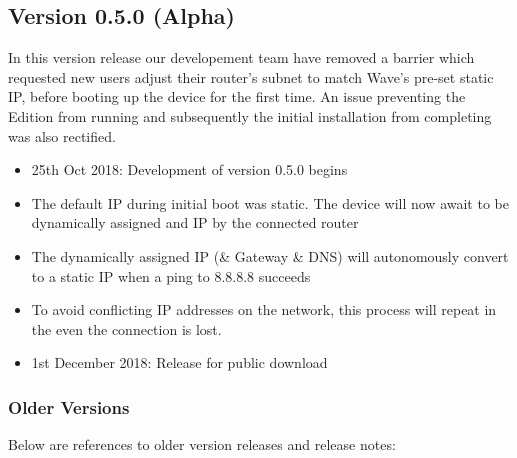 \documentclass[letterpaper,10pt,openany,oneside,english]{sphinxmanual}
\begin{document}
\subsection{Version 0.5.0 (Alpha)}
\label{\detokenize{releasenotes:version-0-5-0-alpha}}
In this version release our developement team have removed a barrier which requested new users adjust their router’s subnet to match Wave’s pre-set static IP, before booting up the device for the first time. An issue preventing the Edition from running and subsequently the initial installation from completing was also rectified.
\begin{itemize}
\item {} 
25th Oct 2018: Development of version 0.5.0 begins

\item {} 
The default IP during initial boot was static. The device will now await to be dynamically assigned and IP by the connected router

\item {} 
The dynamically assigned IP (\& Gateway \& DNS) will autonomously convert to a static IP when a ping to 8.8.8.8 succeeds

\item {} 
To avoid conflicting IP addresses on the network, this process will repeat in the even the connection is lost.

\item {} 
1st December 2018: Release for public download

\end{itemize}


\subsubsection{Older Versions}
\label{\detokenize{releasenotes:older-versions}}
Below are references to older version releases and release notes:
\end{document}
